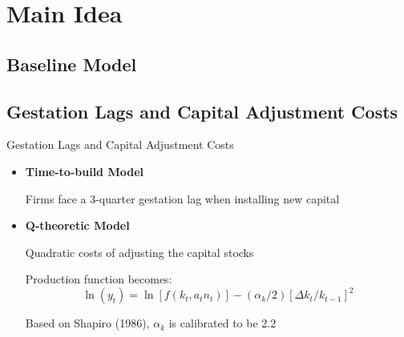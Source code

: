 \documentclass[10pt]{beamer}
\begin{document}
\section{Main Idea}
\subsection{Baseline Model}


\subsection{Gestation Lags and Capital Adjustment Costs}

\begin{frame}{Gestation Lags and Capital Adjustment Costs}
	
	\begin{itemize}
		\item \textbf{Time-to-build Model}
		      
		      Firms face a 3-quarter gestation lag when installing new capital
		      
		\item \textbf{Q-theoretic Model}
		      
		      Quadratic costs of adjusting the capital stocks
		      
		      Production function becomes: $$ \ln \left(y_t\right)= \ln \left[f\left(k_t, a_t
		      	n_t\right)\right] -\left(\alpha_{k} / 2\right)\left[\Delta k_t /
		      k_{t-1}\right]^2 $$
		      
		      Based on Shapiro (1986), $\alpha_{k}$ is calibrated to be 2.2
	\end{itemize}
	
\end{frame}
\end{document}
